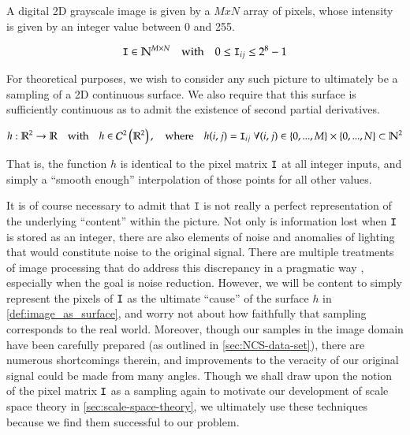 
A digital 2D grayscale image is given by a $MxN$ array of pixels, whose intensity is given by an integer value between 0 and 255.

\begin{defn} \label{def:image_as_pixel_matrix}
	\begin{equation*}
	\mathtt{I} \in \mathbb{N}^{M \times N}
	\quad\textrm{with}\quad
	0 \le \mathtt{I}_{ij} \le 2^8 - 1
	\end{equation*}
\end{defn}
	For theoretical purposes, we wish to consider any such picture to ultimately be a sampling of a 2D continuous surface. We also require that this surface is sufficiently continuous as to admit the existence of second partial derivatives.
	
\begin{defn} \label{def:image_as_surface}
 \begin{equation*}
 h: \mathbb{R}^2 \to \mathbb{R}
 \quad \textrm{with}\quad
 h \in \mathcal{C}^2\left(\mathbb{R}^2\right),
 \quad\textrm{where}\quad
    h(i,j) = \mathtt{I}_{ij}
    \; \forall (i,j) \in
     \left\{0,...,M\right\} \times
     \left\{0,...,N\right\} \subset \mathbb{N}^2
    \end{equation*}
\end{defn}
That is, the function $h$ is identical to the pixel matrix $\mathtt{I}$ at all integer inputs,
and simply a ``smooth enough'' interpolation of those points for all other values.


It is of course necessary to admit that $\mathtt{I}$ is not really a perfect representation of the underlying ``content'' within the picture. Not only is information lost when $\mathtt{I}$ is stored as an integer, there are also elements of noise and anomalies of lighting that would constitute noise to the original signal. There are multiple treatments of image processing that do address this discrepancy in a pragmatic way \cite{DIPGW}, especially when the goal is noise reduction.
However, we will be content to simply represent the pixels of $\mathtt{I}$ as the ultimate ``cause'' of the surface $h$ in \cref{def:image_as_surface}, and worry not about how faithfully that sampling corresponds to the real world.
Moreover, though our samples in the image domain have been carefully prepared (as outlined in \cref{sec:NCS-data-set}), there are numerous shortcomings therein, and improvements to the veracity of our original signal could be made from many angles.
Though we shall draw upon the notion of the pixel matrix $\mathtt{I}$ as a sampling again to motivate our development of scale space theory in \cref{sec:scale-space-theory}, we ultimately use these techniques because we find them successful to our problem.
 

